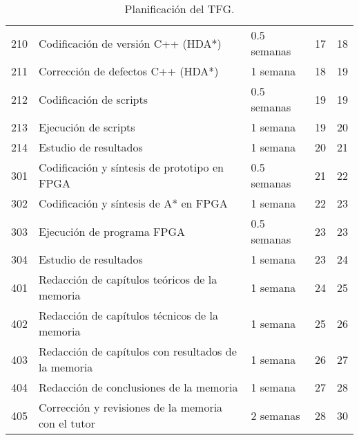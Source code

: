 \begin{center}
\begin{table}[h]
\begin{tabular}{ l | l l l l }
            210 & Codificación de versión C++ (HDA*) & 0.5 semanas & 17 & 18 \\
            211 & Corrección de defectos C++ (HDA*) & 1 semana & 18 & 19 \\
            212 & Codificación de scripts & 0.5 semanas & 19 & 19 \\
            213 & Ejecución de scripts & 1 semana & 19 & 20 \\
            214 & Estudio de resultados & 1 semana & 20 & 21 \\
            \hline
            301 & Codificación y síntesis de prototipo en FPGA & 0.5 semanas & 21 & 22 \\
            302 & Codificación y síntesis de A* en FPGA & 1 semana & 22 & 23 \\
            303 & Ejecución de programa FPGA & 0.5 semanas & 23 & 23 \\
            304 & Estudio de resultados & 1 semana & 23 & 24 \\
            \hline
            401 & Redacción de capítulos teóricos de la memoria & 1 semana & 24 & 25 \\
            402 & Redacción de capítulos técnicos de la memoria & 1 semana & 25 & 26 \\
            403 & Redacción de capítulos con resultados de la memoria & 1 semana & 26 & 27 \\
            404 & Redacción de conclusiones de la memoria & 1 semana & 27 & 28 \\
            405 & Corrección y revisiones de la memoria con el tutor & 2 semanas & 28 & 30 \\
            \hline
        \end{tabular}
        \caption{Planificación del TFG.}
    \end{table}
\end{center}
